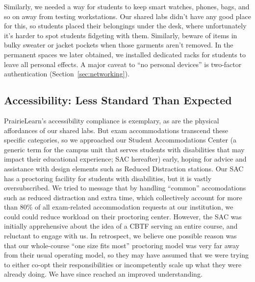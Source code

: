 Similarly, we  needed a way for students to keep smart
watches, phones, bags, and so on away from testing workstations.  Our shared
labs didn't have any good place for this, so students placed
their belongings under the desk, where unfortunately it's harder to
spot students fidgeting with them.
Similarly, beware of items in bulky sweater or jacket
pockets when those garments aren't removed.  In
the permanent spaces we later obtained, we installed dedicated racks
for students to leave all personal effects.
A major caveat to ``no personal devices'' is two-factor
authentication (Section~\ref{sec:networking}).


\subsection{Accessibility: Less Standard Than Expected}
\label{sec:a11y}


PrairieLearn's accessibility compliance is exemplary, as are the physical 
affordances of our shared labs.
But exam accommodations transcend these specific categories,
so we approached our Student Accommodations Center (a generic term for
the campus unit that serves students with disabilities that may impact
their educational experience; SAC hereafter) early, hoping 
for advice and assistance with design elements such as 
Reduced Distraction stations.
Our SAC has a proctoring facility for students with disabilities,
but it is vastly oversubscribed.  
We tried to message that by handling ``common''
accomodations such as reduced distraction and extra time,
which collectively account for more than 80\% of all exam-related
accommodation requests at our institution, we could
could reduce workload on their proctoring center.
However, 
the SAC was initially apprehensive about the idea of a CBTF
serving an entire course, and reluctant to engage with us.
In retrospect, we believe one possible reason was that our whole-course
``one size fits most'' proctoring model was very far away from their
usual operating model, so they may have assumed that we were
trying to either
co-opt their responsibilities or incompetently
scale up what they were already doing.
We have since reached an improved understanding.

